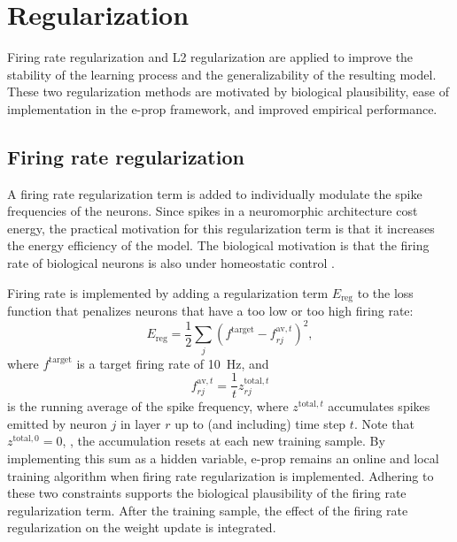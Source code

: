 \section{Regularization}

	Firing rate regularization and L2 regularization are applied to improve the stability of the learning process and the generalizability of the resulting model.
	These two regularization methods are motivated by biological plausibility, ease of implementation in the e-prop framework, and improved empirical performance.

	\subsection{Firing rate regularization}
		A firing rate regularization term is added to individually modulate the spike frequencies of the neurons.
		Since spikes in a neuromorphic architecture cost energy, the practical motivation for this regularization term is that it increases the energy efficiency of the model.
		The biological motivation is that the firing rate of biological neurons is also under homeostatic control \citep{erickson2006activity}.

		Firing rate is implemented by adding a regularization term $E_\text{reg}$ to the loss function that penalizes neurons that have a too low or too high firing rate:
		\begin{equation}
			E_\text{reg} = \frac{1}{2}\sum_j\left(f^\text{target} - f^{\text{av}, t}_{rj}\right)^2,
		\end{equation}
		where $f^\text{target}$ is a target firing rate of \SI{10}{\Hz}, and
		\begin{equation}
		f^{\text{av},t}_{rj} = \frac{1}{t} z^{\text{total},t}_{rj}
		\end{equation}
		is the running average of the spike frequency, where $z^{\text{total},t}$ accumulates spikes emitted by neuron $j$ in layer $r$ up to (and including) time step $t$.
		Note that $z^{\text{total},0} = 0$, \ie, the accumulation resets at each new training sample.
		By implementing this sum as a hidden variable, e-prop remains an online and local training algorithm when firing rate regularization is implemented.
		Adhering to these two constraints supports the biological plausibility of the firing rate regularization term.
		After the training sample, the effect of the firing rate regularization on the weight update is integrated.


